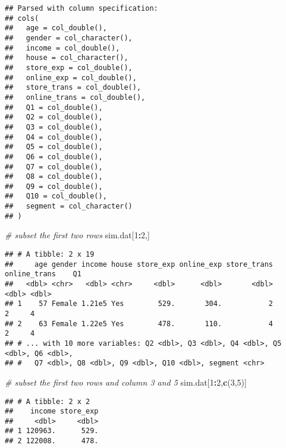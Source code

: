 \documentclass[
]{article}
\newenvironment{Shaded}{\begin{snugshade}}{\end{snugshade}}
\newcommand{\CommentTok}[1]{\textcolor[rgb]{0.56,0.35,0.01}{\textit{#1}}}
\newcommand{\DecValTok}[1]{\textcolor[rgb]{0.00,0.00,0.81}{#1}}
\newcommand{\KeywordTok}[1]{\textcolor[rgb]{0.13,0.29,0.53}{\textbf{#1}}}
\newcommand{\NormalTok}[1]{#1}
\newcommand{\OperatorTok}[1]{\textcolor[rgb]{0.81,0.36,0.00}{\textbf{#1}}}
\begin{document}
\begin{verbatim}
## Parsed with column specification:
## cols(
##   age = col_double(),
##   gender = col_character(),
##   income = col_double(),
##   house = col_character(),
##   store_exp = col_double(),
##   online_exp = col_double(),
##   store_trans = col_double(),
##   online_trans = col_double(),
##   Q1 = col_double(),
##   Q2 = col_double(),
##   Q3 = col_double(),
##   Q4 = col_double(),
##   Q5 = col_double(),
##   Q6 = col_double(),
##   Q7 = col_double(),
##   Q8 = col_double(),
##   Q9 = col_double(),
##   Q10 = col_double(),
##   segment = col_character()
## )
\end{verbatim}

\begin{Shaded}
\begin{Highlighting}[]
\CommentTok{# subset the first two rows}
\NormalTok{sim.dat[}\DecValTok{1}\OperatorTok{:}\DecValTok{2}\NormalTok{,]}
\end{Highlighting}
\end{Shaded}

\begin{verbatim}
## # A tibble: 2 x 19
##     age gender income house store_exp online_exp store_trans online_trans    Q1
##   <dbl> <chr>   <dbl> <chr>     <dbl>      <dbl>       <dbl>        <dbl> <dbl>
## 1    57 Female 1.21e5 Yes        529.       304.           2            2     4
## 2    63 Female 1.22e5 Yes        478.       110.           4            2     4
## # ... with 10 more variables: Q2 <dbl>, Q3 <dbl>, Q4 <dbl>, Q5 <dbl>, Q6 <dbl>,
## #   Q7 <dbl>, Q8 <dbl>, Q9 <dbl>, Q10 <dbl>, segment <chr>
\end{verbatim}

\begin{Shaded}
\begin{Highlighting}[]
\CommentTok{# subset the first two rows and column 3 and 5}
\NormalTok{sim.dat[}\DecValTok{1}\OperatorTok{:}\DecValTok{2}\NormalTok{,}\KeywordTok{c}\NormalTok{(}\DecValTok{3}\NormalTok{,}\DecValTok{5}\NormalTok{)]}
\end{Highlighting}
\end{Shaded}

\begin{verbatim}
## # A tibble: 2 x 2
##    income store_exp
##     <dbl>     <dbl>
## 1 120963.      529.
## 2 122008.      478.
\end{verbatim}

\begin{Shaded}
\end{Shaded}
\end{document}
